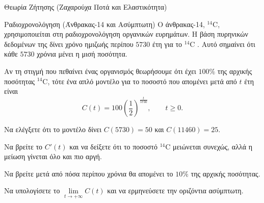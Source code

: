 \begin{problhma}{Θεωρία Ζήτησης (Ζαχαρούχα Ποτά και Ελαστικότητα)}
\begin{center}
\end{center}
\end{problhma}

\begin{problhma}{Ραδιοχρονολόγηση (Άνθρακας-14 και Ασύμπτωτη)}
Ο άνθρακας-14, $^{14}\mathrm{C}$, χρησιμοποιείται στη ραδιοχρονολόγηση
οργανικών ευρημάτων. Η βάση πυρηνικών δεδομένων  της
 δίνει χρόνο ημιζωής περίπου $5730$ έτη για το
$^{14}\mathrm{C}$ \cite{iaeaLiveChartC14}. Αυτό σημαίνει ότι κάθε
$5730$ χρόνια μένει η μισή ποσότητα.

Αν τη στιγμή που πεθαίνει ένας οργανισμός θεωρήσουμε ότι έχει
$100\%$ της αρχικής ποσότητας $^{14}\mathrm{C}$, τότε ένα απλό μοντέλο
για το ποσοστό που απομένει μετά από $t$ έτη είναι
\[
  C(t)=100\left(\frac12\right)^{\frac{t}{5730}},
  \qquad t\geq0.
\]
\begin{alist}
\item Να ελέγξετε ότι το μοντέλο δίνει $C(5730)=50$ και
      $C(11460)=25$.
\item Να βρείτε το $C'(t)$ και να δείξετε ότι το ποσοστό
      $^{14}\mathrm{C}$ μειώνεται συνεχώς, αλλά η μείωση γίνεται όλο
      και πιο αργή.
\item Να βρείτε μετά από πόσα περίπου χρόνια θα απομένει το $10\%$
      της αρχικής ποσότητας.
\item Να υπολογίσετε το $\lim\limits_{t\to+\infty}C(t)$ και να
      ερμηνεύσετε την οριζόντια ασύμπτωτη.
\end{alist}


\end{problhma}
